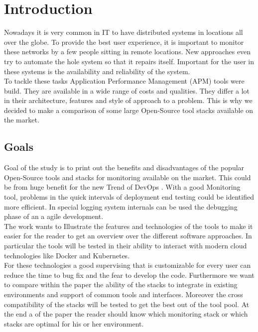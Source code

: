 
\chapter{Introduction}
Nowadays it is very common in IT to have distributed systems in locations all over the globe. To provide the best user experience, it is important to monitor these networks by a few people sitting in remote locations. New approaches even try to automate the hole system so that it repairs itself. Important for the user in these systems is the availability and reliability of the system. 
\\
To tackle these tasks Application Performance Management (APM) tools were build. They are available in a wide range of costs and qualities. They differ a lot in their architecture, features and style of approach to a problem. This is why we decided to make a comparison of some large Open-Source tool stacks available on the market. 
\section*{Goals}
Goal of the study is to print out the benefits and disadvantages of the popular Open-Source tools and stacks for monitoring available on the market. This could be from huge benefit for the new Trend of DevOps \cite{Bass:2015:DSA:2810087}. With a good Monitoring tool, problems in the quick intervals of deployment end testing could be identified more efficient. In special logging system internals can be used the debugging phase of an a agile development.  
\\ The work wants to Illustrate the features and technologies of the tools to make it easier for the reader to get an overview over the different software approaches. In particular the tools will be tested in their ability to interact with modern cloud technologies like Docker and Kubernetes.\\
For these technologies a good supervising that is customizable for every user can reduce the time to bug fix and the fear to develop the code.
 Furthermore we want to compare within the paper the ability of the stacks to integrate in existing environments and support of common tools and interfaces. Moreover the cross compatibility of the stacks will be tested to get the best out of the tool pool. At the end a of the paper the reader should know which monitoring stack or which stacks are optimal for his or her environment.  

